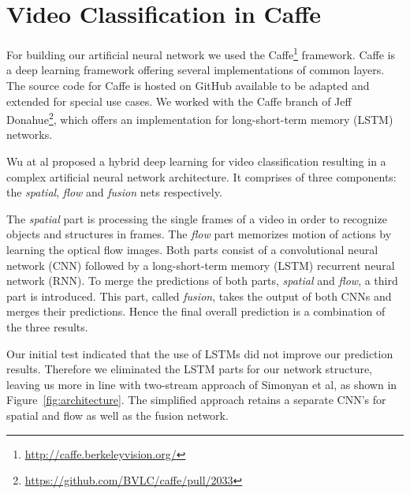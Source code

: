 \section{Video Classification in Caffe}
\label{sec:classification}

For building our artificial neural network we used the Caffe\footnote{\url{http://caffe.berkeleyvision.org/}} framework.
Caffe is a deep learning framework offering several implementations of common layers.
The source code for Caffe is hosted on GitHub available to be adapted and extended for special use cases.
We worked with the Caffe branch of Jeff Donahue\footnote{\url{https://github.com/BVLC/caffe/pull/2033}}, which offers an implementation for long-short-term memory (LSTM) networks.

Wu at al \cite{wu2015modeling} proposed a hybrid deep learning for video classification resulting in a complex artificial neural network architecture.
It comprises of three components: the \emph{spatial}, \emph{flow} and \emph{fusion} nets respectively.

The \emph{spatial} part is processing the single frames of a video in order to recognize objects and structures in frames.
The \emph{flow} part memorizes motion of actions by learning the optical flow images.
Both parts consist of a convolutional neural network (CNN) followed by a long-short-term memory (LSTM) recurrent neural network (RNN).
To merge the predictions of both parts, \emph{spatial} and \emph{flow}, a third part is introduced.
This part, called \emph{fusion}, takes the output of both CNNs and merges their predictions.
Hence the final overall prediction is a combination of the three results.

Our initial test indicated that the use of LSTMs did not improve our prediction results.
Therefore we eliminated the LSTM parts for our network structure, leaving us more in line with two-stream approach of Simonyan et al\cite{simonyan2014two}, as shown in Figure~\ref{fig:architecture}.
The simplified approach retains a separate CNN's for spatial and flow as well as the fusion network.

